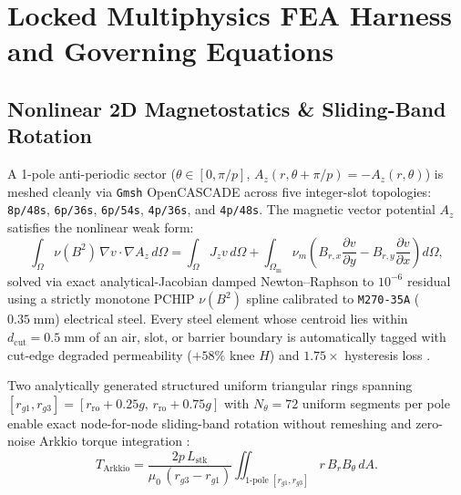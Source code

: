 \documentclass[twocolumn,10pt]{article}
\begin{document}
\section{Locked Multiphysics FEA Harness and Governing Equations}

\subsection{Nonlinear 2D Magnetostatics \& Sliding-Band Rotation}
A 1-pole anti-periodic sector ($\theta\in[0,\pi/p]$, $A_z(r,\theta+\pi/p)=-A_z(r,\theta)$) is meshed cleanly via \texttt{Gmsh} OpenCASCADE \citep{geuzaine2009gmsh} across five integer-slot topologies: \texttt{8p/48s}, \texttt{6p/36s}, \texttt{6p/54s}, \texttt{4p/36s}, and \texttt{4p/48s}. The magnetic vector potential $A_z$ satisfies the nonlinear weak form:
\begin{equation}
  \int_\Omega \nu(B^2)\,\nabla v\cdot\nabla A_z\,d\Omega
  = \int_\Omega J_z v\,d\Omega + \int_{\Omega_{\text{m}}} \nu_m\!\left(B_{r,x}\frac{\partial v}{\partial y} - B_{r,y}\frac{\partial v}{\partial x}\right) d\Omega,
  \label{eq:maxwell}
\end{equation}
solved via exact analytical-Jacobian damped Newton--Raphson to $10^{-6}$ residual using a strictly monotone PCHIP $\nu(B^2)$ spline calibrated to \texttt{M270-35A} ($0.35\;\text{mm}$) electrical steel. Every steel element whose centroid lies within $d_{\text{cut}}=0.5\;\text{mm}$ of an air, slot, or barrier boundary is automatically tagged with cut-edge degraded permeability ($+58\%$ knee $H$) and $1.75\times$ hysteresis loss \citep{bali2017cutedge}.

Two analytically generated structured uniform triangular rings spanning $[r_{g1}, r_{g3}]=[r_{\text{ro}}+0.25g,\, r_{\text{ro}}+0.75g]$ with $N_\theta=72$ uniform segments per pole enable exact node-for-node sliding-band rotation without remeshing and zero-noise Arkkio torque integration \citep{arkkio1987analysis}:
\begin{equation}
  T_{\text{Arkkio}} = \frac{2p\,L_{\text{stk}}}{\mu_0\,(r_{g3}-r_{g1})} \iint_{\text{1-pole }[r_{g1},r_{g3}]} r\,B_r B_\theta\,dA.
  \label{eq:arkkio}
\end{equation}
\end{document}
